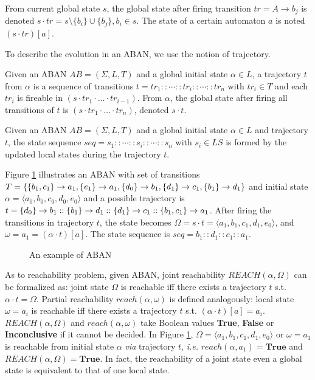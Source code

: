 \begin{definition}[Dynamics]
    From current global state $s$, the global state after firing transition $tr=A\to b_j$ is denoted $s \cdot tr = s \setminus \{b_i\} \cup \{b_j\}, b_i \in s$.
    The state of a certain automaton $a$ is noted $(s\cdot tr)[a]$.
\end{definition}

To describe the evolution in an ABAN, we use the notion of trajectory.
\begin{definition}[Trajectory]
Given an ABAN $AB = (\Sigma,L,T)$ and a global initial state $\alpha\in L$, a trajectory $t$ from $\alpha$ is a sequence of transitions $t=tr_1::\cdots :: tr_i::\cdots ::tr_n$ with $tr_i\in T$ and each $tr_i$ is fireable in $(s \cdot tr_1 \cdot \ldots \cdot tr_{i-1})$.
From $\alpha$, the global state after firing all transitions of $t$ is $(s \cdot tr_1 \cdot \ldots \cdot tr_n)$, denoted $s \cdot t$.
\end{definition}

\begin{definition}
Given an ABAN $AB = (\Sigma,L,T)$ and a global initial state $\alpha\in L$ and trajectory $t$, the state sequence $seq=s_1::\cdots :: s_i::\cdots ::s_n$ with $s_i\in LS$ is formed by the updated local states during the trajectory $t$.
\end{definition}


\begin{example}
    Figure \ref{exampleABAN} illustrates an ABAN with set of transitions $T=\{\acm{b_1,c_1}{a_0}{a_1},\acm{e_1}{a_0}{a_1},\acm{d_0}{b_0}{b_1},\acm{d_1}{c_0}{c_1},\acm{b_1}{d_0}{d_1}\}$ and initial state $\alpha=\langle a_0,b_0,c_0,d_0,e_0\rangle$ and a possible trajectory is $t=\acm{d_0}{b_0}{b_1}::\acm{b_1}{d_0}{d_1}::\acm{d_1}{c_0}{c_1}::\acm{b_1,c_1}{a_0}{a_1}$.
    After firing the transitions in trajectory $t$, the state becomes $\Omega=s\cdot t=\langle a_1,b_1,c_1,d_1,e_0\rangle$, and $\omega= a_1= (\alpha\cdot t)[a]$. The state sequence is $seq=b_1::d_1::c_1::a_1$.
\end{example}

\begin{figure}[ht]
\centering

\caption[Example of ABAN]{An example of ABAN}\label{exampleABAN}
\end{figure}
As to reachability problem, given ABAN, joint reachability $REACH (\alpha,\Omega)$ can be formalized as: joint state $\Omega$ is reachable iff there exists a trajectory $t$ s.t. $\alpha\cdot t=\Omega$.
Partial reachability $reach(\alpha,\omega)$ is defined analogously: local state $\omega=a_i$ is reachable iff there exists a trajectory $t$ s.t. $(\alpha\cdot t)[a]=a_i$.
$REACH (\alpha,\Omega)$ and $reach(\alpha,\omega)$ take Boolean values \textbf{True}, \textbf{False} or \textbf{Inconclusive} if it cannot be decided.
In Figure \ref{exampleABAN}, $\Omega=\langle a_1,b_1,c_1,d_1,e_0\rangle$ or $\omega=a_1$ is reachable from initial state $\alpha$ \textit{via} trajectory $t$, \textit{i.e.} $reach(\alpha,a_1)=\textbf{True}$ and $REACH(\alpha,\Omega)=\textbf{True}$. 
In fact, the reachability of a joint state even a global state is equivalent to that of one local state. 

